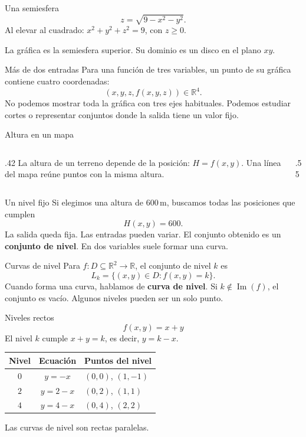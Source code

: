 \begin{frame}{Una semiesfera}
\[z=\sqrt{9-x^2-y^2}.\]
Al elevar al cuadrado: $x^2+y^2+z^2=9$, con $z\ge0$.

La gráfica es la semiesfera superior. Su dominio es un disco en el plano $xy$.
\end{frame}
\begin{frame}{Más de dos entradas}
Para una función de tres variables, un punto de su gráfica contiene cuatro coordenadas:
\[(x,y,z,f(x,y,z))\in\mathbb R^4.\]
No podemos mostrar toda la gráfica con tres ejes habituales.
\medskip
Podemos estudiar cortes o representar conjuntos donde la salida tiene un valor fijo.
\end{frame}
\begin{frame}{Altura en un mapa}
\begin{columns}[c]
\begin{column}{.42\textwidth}
La altura de un terreno depende de la posición: $H=f(x,y)$.
\medskip
Una línea del mapa reúne puntos con la misma altura.
\end{column}
\begin{column}{.55\textwidth}\end{column}
\end{columns}
\end{frame}
\begin{frame}{Un nivel fijo}
Si elegimos una altura de $600\,\mathrm m$, buscamos todas las posiciones que cumplen
\[H(x,y)=600.\]
La salida queda fija. Las entradas pueden variar.
\medskip
El conjunto obtenido es un \textbf{conjunto de nivel}. En dos variables suele formar una curva.
\end{frame}
\begin{frame}{Curvas de nivel}
Para $f:D\subseteq\mathbb R^2\to\mathbb R$, el conjunto de nivel $k$ es
\[L_k=\{(x,y)\in D:f(x,y)=k\}.\]
Cuando forma una curva, hablamos de \textbf{curva de nivel}.
\medskip
Si $k\notin\operatorname{Im}(f)$, el conjunto es vacío. Algunos niveles pueden ser un solo punto.
\end{frame}
\begin{frame}{Niveles rectos}
\[f(x,y)=x+y\]
El nivel $k$ cumple $x+y=k$, es decir, $y=k-x$.
\begin{center}\begin{tabular}{ccl}
Nivel & Ecuación & Puntos del nivel\\\hline
$0$ & $y=-x$ & $(0,0)$, $(1,-1)$\\[2mm]
$2$ & $y=2-x$ & $(0,2)$, $(1,1)$\\[2mm]
$4$ & $y=4-x$ & $(0,4)$, $(2,2)$
\end{tabular}\end{center}
Las curvas de nivel son rectas paralelas.
\end{frame}
